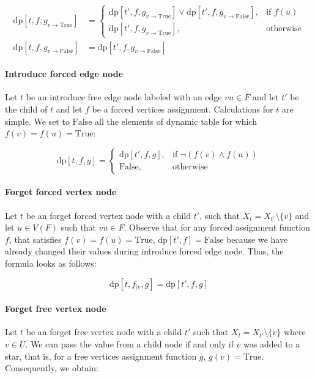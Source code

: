 \documentclass[en]{pracamgr}
\newcommand{\dpt}[1]{\textrm{dp}[#1]}
\newcommand{\true}{\textrm{True}}
\newcommand{\false}{\textrm{False}}
\begin{document}
\begin{equation*}
\begin{split}
	\dpt{t,f,g_{v \rightarrow \true}} & = 
		\begin{cases}
			\dpt{t',f,g_{v \rightarrow \true}} \lor \dpt{t',f,g_{v \rightarrow \false}}, & \text{if $f(u)$} \\
			\dpt{t',f,g_{v \rightarrow \true}}, & \text{otherwise}
		\end{cases}	
	\\
	\dpt{t,f,g_{v \rightarrow \false}} & = \dpt{t',f,g_{v \rightarrow \false}}\end{split}
\end{equation*}

\paragraph{Introduce forced edge node} Let $t$ be an introduce free edge node labeled with an edge $vu \in F$ and let $t'$ be the child of $t$ and let $f$ be a forced vertices assignment. Calculations for $t$ are simple. We set to $\false$ all the elements of dynamic table for which $f(v)=f(u)=\true$:

\begin{equation*}
	\dpt{t,f,g} =
	\begin{cases}
		\dpt{t',f,g}, & \text{if $\neg(f(v) \land f(u))$} \\
		\false, & \text{otherwise}
	\end{cases}
\end{equation*}

\paragraph{Forget forced vertex node} Let $t$ be an forget forced vertex node with a child $t'$, such that $X_t = X_{t'} \setminus \{v\}$ and let $u \in V(F)$ such that $vu \in F$. Observe that for any forced assignment function $f$, that satisfies $f(v)=f(u)=\true$, $\dpt{t',f} = \false$ because we have already changed their values during introduce forced edge node. Thus, the formula looks as follows:

\begin{equation*}
	\dpt{t,f_{|v},g} = \dpt{t',f,g}
\end{equation*}

\paragraph{Forget free vertex node} Let $t$ be an forget free vertex node with a child $t'$ such that $X_t = X_{t'} \setminus \{v\}$ where $v \in U$. We can pass the value from a child node if and only if $v$ was added to a star, that is, for a free vertices assignment function $g$, $g(v)=\true$. Consequently, we obtain:
\end{document}
